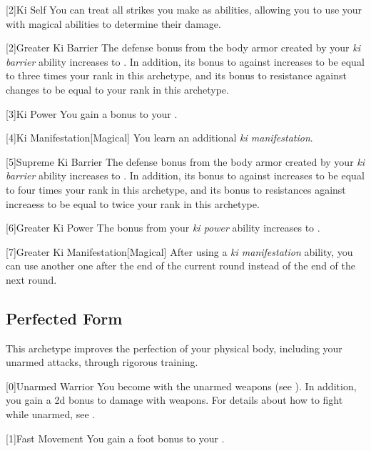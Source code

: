         [2]{Ki Self} You can treat all strikes you make as  abilities, allowing you to use your  with magical abilities to determine their damage.

        [2]{Greater Ki Barrier} 
        The defense bonus from the body armor created by your \textit{ki barrier} ability increases to .
        In addition, its bonus to  against  increases to be equal to three times your rank in this archetype, and its bonus to resistance against  changes to be equal to your rank in this archetype.

        [3]{Ki Power}
        You gain a  bonus to your  .

        [4]{Ki Manifestation}[Magical]
        You learn an additional \textit{ki manifestation}.

        [5]{Supreme Ki Barrier}
        The defense bonus from the body armor created by your \textit{ki barrier} ability increases to .
        In addition, its bonus to  against  increases to be equal to four times your rank in this archetype, and its bonus to resistances against  increaess to be equal to twice your rank in this archetype.

        [6]{Greater Ki Power} The bonus from your \textit{ki power} ability increases to .

        [7]{Greater Ki Manifestation}[Magical] After using a \textit{ki manifestation} ability, you can use another one after the end of the current round instead of the end of the next round.

    \newpage
    \subsection{Perfected Form}
        This archetype improves the perfection of your physical body, including your unarmed attacks, through rigorous training.

        [0]{Unarmed Warrior} You become  with the unarmed weapons  (see ).
        In addition, you gain a \plus2d bonus to damage with  weapons.
        For details about how to fight while unarmed, see .

        [1]{Fast Movement} You gain a  foot bonus to your .

